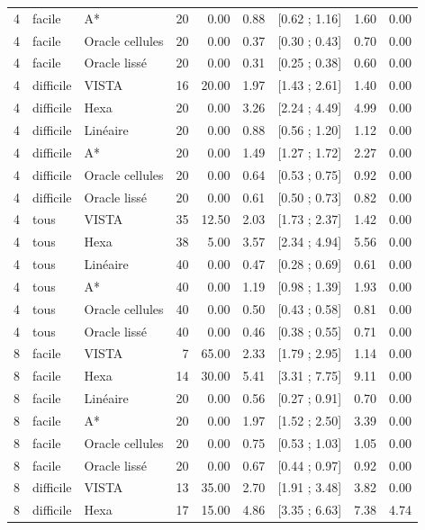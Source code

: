 \begin{table}[t]
\begin{tabular}{lllrrrrrr}
4 & facile & A* & 20 & 0.00 & 0.88 & [0.62 ; 1.16] & 1.60 & 0.00 \\
4 & facile & Oracle cellules & 20 & 0.00 & 0.37 & [0.30 ; 0.43] & 0.70 & 0.00 \\
4 & facile & Oracle lissé & 20 & 0.00 & 0.31 & [0.25 ; 0.38] & 0.60 & 0.00 \\
4 & difficile & VISTA & 16 & 20.00 & 1.97 & [1.43 ; 2.61] & 1.40 & 0.00 \\
4 & difficile & Hexa & 20 & 0.00 & 3.26 & [2.24 ; 4.49] & 4.99 & 0.00 \\
4 & difficile & Linéaire & 20 & 0.00 & 0.88 & [0.56 ; 1.20] & 1.12 & 0.00 \\
4 & difficile & A* & 20 & 0.00 & 1.49 & [1.27 ; 1.72] & 2.27 & 0.00 \\
4 & difficile & Oracle cellules & 20 & 0.00 & 0.64 & [0.53 ; 0.75] & 0.92 & 0.00 \\
4 & difficile & Oracle lissé & 20 & 0.00 & 0.61 & [0.50 ; 0.73] & 0.82 & 0.00 \\
4 & tous & VISTA & 35 & 12.50 & 2.03 & [1.73 ; 2.37] & 1.42 & 0.00 \\
4 & tous & Hexa & 38 & 5.00 & 3.57 & [2.34 ; 4.94] & 5.56 & 0.00 \\
4 & tous & Linéaire & 40 & 0.00 & 0.47 & [0.28 ; 0.69] & 0.61 & 0.00 \\
4 & tous & A* & 40 & 0.00 & 1.19 & [0.98 ; 1.39] & 1.93 & 0.00 \\
4 & tous & Oracle cellules & 40 & 0.00 & 0.50 & [0.43 ; 0.58] & 0.81 & 0.00 \\
4 & tous & Oracle lissé & 40 & 0.00 & 0.46 & [0.38 ; 0.55] & 0.71 & 0.00 \\
8 & facile & VISTA & 7 & 65.00 & 2.33 & [1.79 ; 2.95] & 1.14 & 0.00 \\
8 & facile & Hexa & 14 & 30.00 & 5.41 & [3.31 ; 7.75] & 9.11 & 0.00 \\
8 & facile & Linéaire & 20 & 0.00 & 0.56 & [0.27 ; 0.91] & 0.70 & 0.00 \\
8 & facile & A* & 20 & 0.00 & 1.97 & [1.52 ; 2.50] & 3.39 & 0.00 \\
8 & facile & Oracle cellules & 20 & 0.00 & 0.75 & [0.53 ; 1.03] & 1.05 & 0.00 \\
8 & facile & Oracle lissé & 20 & 0.00 & 0.67 & [0.44 ; 0.97] & 0.92 & 0.00 \\
8 & difficile & VISTA & 13 & 35.00 & 2.70 & [1.91 ; 3.48] & 3.82 & 0.00 \\
8 & difficile & Hexa & 17 & 15.00 & 4.86 & [3.35 ; 6.63] & 7.38 & 4.74 \\

\end{tabular}
\end{table}

